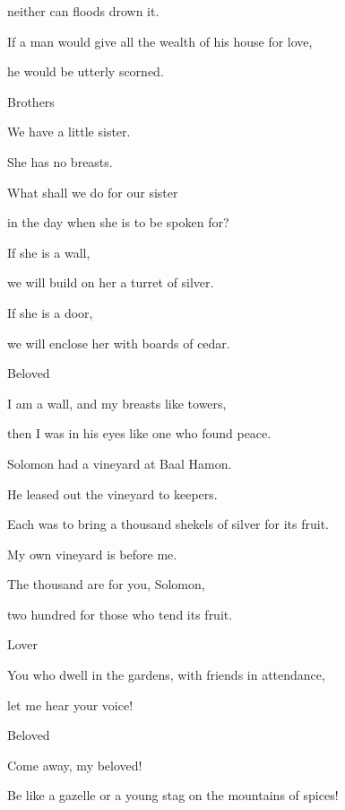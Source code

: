 {\par }{\QB neither can floods drown it.
\par }{\Q If a man would give all the wealth of his house for love,
\par }{\QB he would be utterly scorned.
\par }{\SP Brothers
\par }{\Q {}We have a little sister.
\par }{\QB She has no breasts.
\par }{\Q What shall we do for our sister
\par }{\QB in the day when she is to be spoken for?
\par }{\BB \par }{\Q {}If she is a wall,
\par }{\QB we will build on her a turret of silver.
\par }{\Q If she is a door,
\par }{\QB we will enclose her with boards of cedar.
\par }{\SP Beloved
\par }{\Q {}I am a wall, and my breasts like towers,
\par }{\QB then I was in his eyes like one who found peace.
\par }{\Q {}Solomon had a vineyard at Baal Hamon.
\par }{\QB He leased out the vineyard to keepers.
\par }{\QB Each was to bring a thousand shekels of silver for its fruit.
\par }{\Q {}My own vineyard is before me.
\par }{\QB The thousand are for you, Solomon,
\par }{\QB two hundred for those who tend its fruit.
\par }{\SP Lover
\par }{\Q {}You who dwell in the gardens, with friends in attendance,
\par }{\QB let me hear your voice!
\par }{\SP Beloved
\par }{\Q {}Come away, my beloved!
\par }{\QB Be like a gazelle or a young stag on the mountains of spices!
\par }